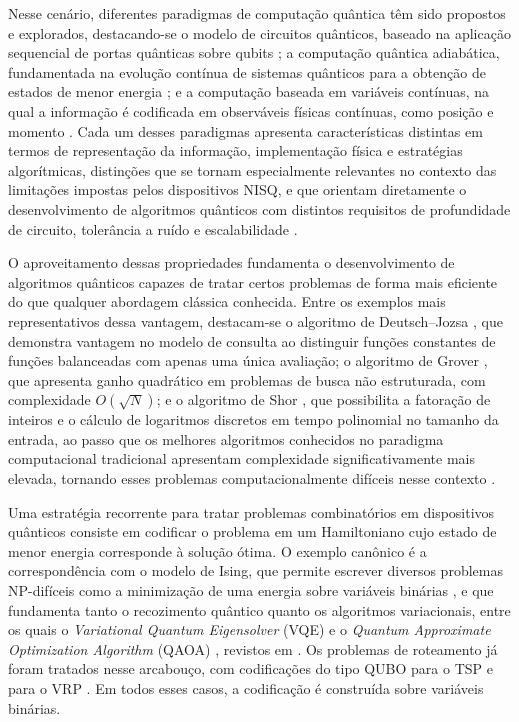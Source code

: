 Nesse cenário, diferentes paradigmas de computação quântica têm sido propostos e explorados, destacando-se o modelo de circuitos quânticos, baseado na aplicação sequencial de portas quânticas sobre qubits \cite{nielsen_quantum_2002}; a computação quântica adiabática, fundamentada na evolução contínua de sistemas quânticos para a obtenção de estados de menor energia \cite{albash2018adiabatic}; e a computação baseada em variáveis contínuas, na qual a informação é codificada em observáveis físicas contínuas, como posição e momento \cite{weedbrook2012gaussian}. Cada um desses paradigmas apresenta características distintas em termos de representação da informação, implementação física e estratégias algorítmicas, distinções que se tornam especialmente relevantes no contexto das limitações impostas pelos dispositivos NISQ, e que orientam diretamente o desenvolvimento de algoritmos quânticos com distintos requisitos de profundidade de circuito, tolerância a ruído e escalabilidade \cite{montanaro2016quantum}.

O aproveitamento dessas propriedades fundamenta o desenvolvimento de algoritmos quânticos capazes de tratar certos problemas de forma mais eficiente do que qualquer abordagem clássica conhecida. Entre os exemplos mais representativos dessa vantagem, destacam-se o algoritmo de Deutsch–Jozsa \cite{deutsch1991rapid}, que demonstra vantagem no modelo de consulta ao distinguir funções constantes de funções balanceadas com apenas uma única avaliação; o algoritmo de Grover \cite{grover1996fast}, que apresenta ganho quadrático em problemas de busca não estruturada, com complexidade $O(\sqrt{N})$; e o algoritmo de Shor \cite{shor1999polynomial}, que possibilita a fatoração de inteiros e o cálculo de logaritmos discretos em tempo polinomial no tamanho da entrada, ao passo que os melhores algoritmos conhecidos no paradigma computacional tradicional apresentam complexidade significativamente mais elevada, tornando esses problemas computacionalmente difíceis nesse contexto \cite{lenstra1993development}.

Uma estratégia recorrente para tratar problemas combinatórios em dispositivos quânticos consiste em codificar o problema em um Hamiltoniano cujo estado de menor energia corresponde à solução ótima. O exemplo canônico é a correspondência com o modelo de Ising, que permite escrever diversos problemas NP-difíceis como a minimização de uma energia sobre variáveis binárias \cite{lucas2014ising}, e que fundamenta tanto o recozimento quântico \cite{kadowaki1998quantum} quanto os algoritmos variacionais, entre os quais o \textit{Variational Quantum Eigensolver} (VQE) \cite{peruzzo2014variational} e o \textit{Quantum Approximate Optimization Algorithm} (QAOA) \cite{farhi_quantum_2014}, revistos em \cite{cerezo2021variational, moll2018quantum}. Os problemas de roteamento já foram tratados nesse arcabouço, com codificações do tipo QUBO para o TSP \cite{gonzalez2022gps} e para o VRP \cite{irie2019quantum, huang_solving_nodate}. Em todos esses casos, a codificação é construída sobre variáveis binárias.

